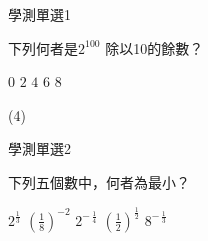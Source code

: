 \begin{QUESTIONS}
    \begin{QUESTION}
        \begin{ExamInfo}{88}{學測}{單選}{1}
        \end{ExamInfo}
        \begin{ExamAnsRateInfo}{}{}{}{}
        \end{ExamAnsRateInfo}
        \begin{QBODY}
            下列何者是$ 2^{100} $ 除以10的餘數？
            \begin{QOPS}
                \QOP $0$
                \QOP $2$
                \QOP $4$
                \QOP $6$
                \QOP $8$
            \end{QOPS}
        \end{QBODY}
        \begin{QFROMS}
        \end{QFROMS}
        \begin{QTAGS}\end{QTAGS}
        \begin{QANS}
            (4)
        \end{QANS}
        \begin{QSOLLIST}
        \end{QSOLLIST}
        \begin{QEMPTYSPACE}
        \end{QEMPTYSPACE}
    \end{QUESTION}
    \begin{QUESTION}
        \begin{ExamInfo}{88}{學測}{單選}{2}
        \end{ExamInfo}
        \begin{ExamAnsRateInfo}{}{}{}{}
        \end{ExamAnsRateInfo}
        \begin{QBODY}
            下列五個數中，何者為最小？
            \begin{QOPS}
                \QOP ${{2}^{\frac{1}{3}}}$
                \QOP ${{\left( \frac{1}{8} \right)}^{-2}}$
                \QOP $2^{-\,\frac{1}{4}}$
                \QOP ${{\left( \frac{1}{2} \right)}^{\frac{1}{2}}}$
                \QOP $8^{-\,\frac{1}{3}}$
            \end{QOPS}
        \end{QBODY}
        \begin{QFROMS}
        \end{QFROMS}

\end{QUESTION}
\end{QUESTIONS}
